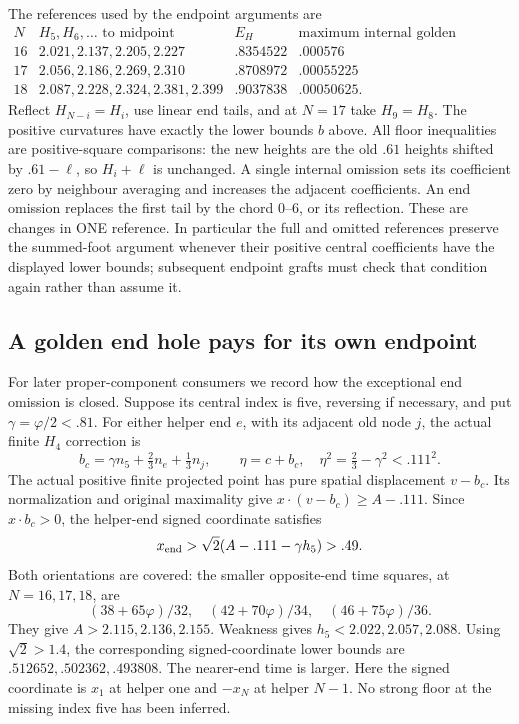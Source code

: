 The references used by the endpoint arguments are
\[
\begin{array}{c|c|c|c}
N&H_5,H_6,\ldots\text{ to midpoint}&E_H&
 \text{maximum internal golden omission loss}\\ \hline
16&2.021,2.137,2.205,2.227&.8354522&.000576\\
17&2.056,2.186,2.269,2.310&.8708972&.00055225\\
18&2.087,2.228,2.324,2.381,2.399&.9037838&.00050625 .
\end{array}
\]
Reflect \(H_{N-i}=H_i\), use linear end tails, and at \(N=17\)
take \(H_9=H_8\).
The positive curvatures have exactly the lower bounds \(b\) above.
All floor inequalities are positive-square comparisons:
the new heights are the old \(.61\) heights shifted by
\(.61-\ell\), so \(H_i+\ell\) is unchanged.
A single internal omission sets its coefficient zero by neighbour
averaging and increases the adjacent coefficients.
An end omission replaces the first tail by the chord \(0\)--\(6\),
or its reflection.  These are changes in ONE reference.
In particular the full and omitted references preserve the
summed-foot argument whenever their positive central coefficients
have the displayed lower bounds; subsequent endpoint grafts must
check that condition again rather than assume it.

\subsection{A golden end hole pays for its own endpoint}
\label{app:arithgoldenend}

For later proper-component consumers we record how the exceptional
end omission is closed.  Suppose its central index is five,
reversing if necessary, and put \(\gamma=\varphi/2<.81\).
For either helper end \(e\), with its adjacent old node \(j\),
the actual finite \(H_4\) correction is
\[
 b_c=\gamma n_5+\tfrac23n_e+\tfrac13n_j,\qquad
 \eta=c+b_c,\quad
 \eta^2=\tfrac23-\gamma^2<.111^2 .
\]
The actual positive finite projected point has pure spatial
displacement \(v-b_c\).
Its normalization and original maximality give
\(x\cdot(v-b_c)\ge A-.111\).
Since \(x\cdot b_c>0\), the helper-end signed coordinate satisfies
\[
                  x_{\rm end}>
             \sqrt2(A-.111-\gamma h_5)>.49 .
\]
Both orientations are covered: the smaller opposite-end time
squares, at \(N=16,17,18\), are
\[
 (38+65\varphi)/32,\quad(42+70\varphi)/34,\quad
 (46+75\varphi)/36.
\]
They give \(A>2.115,2.136,2.155\).
Weakness gives \(h_5<2.022,2.057,2.088\).
Using \(\sqrt2>1.4\), the corresponding signed-coordinate lower
bounds are \(.512652,.502362,.493808\).
The nearer-end time is larger.
Here the signed coordinate is \(x_1\) at helper one and
\(-x_N\) at helper \(N-1\).
No strong floor at the missing index five has been inferred.

